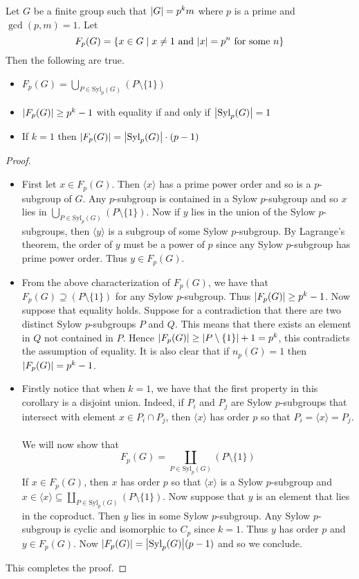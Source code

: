 \documentclass[a4paper]{article}
\begin{document}
\begin{crl}{}{} Let $G$ be a finite group such that $\abs{G}=p^km$ where $p$ is a prime and $\gcd(p,m)=1$. Let $$F_p(G)=\{x\in G\;|\;x\neq 1\text{ and }\abs{x}=p^n\text{ for some }n\}$$ Then the following are true. 
\begin{itemize}
\item $F_p(G)=\bigcup_{P\in\text{Syl}_p(G)}(P\setminus\{1\})$
\item $\abs{F_p(G)}\geq p^k-1$ with equality if and only if $\abs{\text{Syl}_p(G)}=1$
\item If $k=1$ then $\abs{F_p(G)}=\abs{\text{Syl}_p(G)}\cdot(p-1)$
\end{itemize} \tcbline
\begin{proof}~\\
\begin{itemize}
\item First let $x\in F_p(G)$. Then $\langle x\rangle$ has a prime power order and so is a $p$-subgroup of $G$. Any $p$-subgroup is contained in a Sylow $p$-subgroup and so $x$ lies in $\bigcup_{P\in\text{Syl}_p(G)}(P\setminus\{1\})$. Now if $y$ lies in the union of the Sylow $p$-subgroups, then $\langle y\rangle$ is a subgroup of some Sylow $p$-subgroup. By Lagrange's theorem, the order of $y$ must be a power of $p$ since any Sylow $p$-subgroup has prime power order. Thus $y\in F_p(G)$. 

\item From the above characterization of $F_p(G)$, we have that $F_p(G)\supseteq(P\setminus\{1\})$ for any Sylow $p$-subgroup. Thus $\abs{F_p(G)}\geq p^k-1$. Now suppose that equality holds. Suppose for a contradiction that there are two distinct Sylow $p$-subgroups $P$ and $Q$. This means that there exists an element in $Q$ not contained in $P$. Hence $\abs{F_p(G)}\geq\abs{P\setminus\{1\}}+1=p^k$, this contradicts the assumption of equality. It is also clear that if $n_p(G)=1$ then $\abs{F_p(G)}=p^k-1$. 

\item Firstly notice that when $k=1$, we have that the first property in this corollary is a disjoint union. Indeed, if $P_i$ and $P_j$ are Sylow $p$-subgroups that intersect with element $x\in P_i\cap P_j$, then $\langle x\rangle$ has order $p$ so that $P_i=\langle x\rangle=P_j$. \\~\\

We will now show that $$F_p(G)=\coprod_{P\in\text{Syl}_p(G)}(P\setminus\{1\})$$ If $x\in F_p(G)$, then $x$ has order $p$ so that $\langle x\rangle$ is a Sylow $p$-subgroup and $x\in\langle x\rangle\subseteq\coprod_{P\in\text{Syl}_p(G)}(P\setminus\{1\})$. Now suppose that $y$ is an element that lies in the coproduct. Then $y$ lies in some Sylow $p$-subgroup. Any Sylow $p$-subgroup is cyclic and isomorphic to $C_p$ since $k=1$. Thus $y$ has order $p$ and $y\in F_p(G)$. Now $\abs{F_p(G)}=\abs{\text{Syl}_p(G)}(p-1)$ and so we conclude. 
\end{itemize}
This completes the proof. 
\end{proof}
\end{crl}
\end{document}
